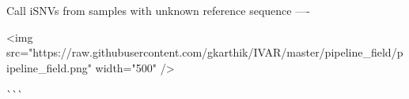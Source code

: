 


\begin{DoxyCode}
Call iSNVs from samples with unknown reference sequence
----

<img src="https://raw.githubusercontent.com/gkarthik/IVAR/master/pipeline\_field/pipeline\_field.png"
       width="500" />
\end{DoxyCode}


\`{}\`{}\`{} 
